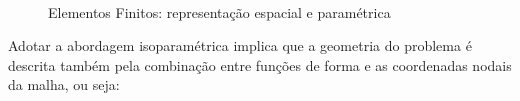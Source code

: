 \begin{figure}[!htbp]
	\caption{Elementos Finitos: representação espacial e paramétrica}
	\centering	
	\\
\end{figure}

Adotar a abordagem isoparamétrica implica que a geometria do problema é descrita também pela combinação entre funções de forma e as coordenadas nodais da malha, ou seja:

